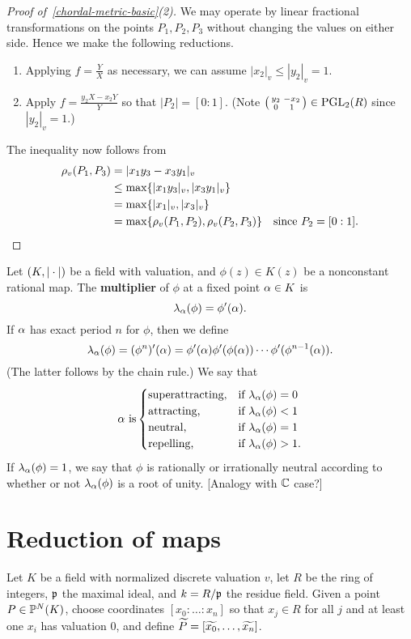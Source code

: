 \begin{proof}[Proof of~\ref{chordal-metric-basic}(2)]
We may operate by linear fractional transformations on the points $P_1,P_2,P_3$ without changing the values on either side. Hence we make the following reductions.
\begin{enumerate}
\item
Applying $f=\frac{Y}{X}$ as necessary, we can assume $|x_2|_v\le |y_2|_v=1$.
\item
Apply $f=\frac{y_2X-x_2Y}{Y}$ so that $|P_2|=[0:1]$. (Note $\left(\begin{smallmatrix} {y_2}&{-x_2}\\ {0}&{1} \end{smallmatrix}\right)\in \operatorname{PGL}_2(R)$ since $|y_2|_v=1$.)
\end{enumerate}
The inequality now follows from
\begin{align*}
\rho_v(P_1,P_3)&=
|x_1y_3-x_3y_1|_v\\
&\le \max \{|x_1y_3|_v,|x_3y_1|_v\}\\
&=\max\{|x_1|_v,|x_3|_v\}\\
&=\max\{\rho_v(P_1,P_2),\rho_v(P_2,P_3)\}&\text{since }P_2=[0:1].\qedhere
\end{align*}
\end{proof}
\begin{df}
Let $(K,|\cdot|)$ be a field with valuation, and $\phi(z)\in K(z)$ be a nonconstant rational map. The \textbf{multiplier} of $\phi$ at a fixed point $\alpha\in K$ is
\[
\lambda_{\alpha}(\phi)=\phi'(\alpha).
\]
If $\alpha$ has exact period $n$ for $\phi$, then we define
\[
\lambda_{\alpha}(\phi)=(\phi^n)'(\alpha)=\phi'(\alpha)\phi'(\phi(\alpha))\cdots \phi'(\phi^{n-1}(\alpha)).
\]
(The latter follows by the chain rule.)
We say that
\[
\alpha\text{ is}
\begin{cases}
\text{superattracting,}&\text{if }\lambda_{\alpha}(\phi)=0\\
\text{attracting,}&\text{if }\lambda_{\alpha}(\phi)<1\\
\text{neutral,}&\text{if }\lambda_{\alpha}(\phi)=1\\
\text{repelling,}&\text{if }\lambda_{\alpha}(\phi)>1.
\end{cases}
\]
If $\lambda_{\alpha}(\phi)=1$, we say that $\phi$ is rationally or irrationally neutral according to whether or not $\lambda_{\alpha}(\phi)$ is a root of unity.
[Analogy with $\mathbb{C}$ case?]
\end{df}
\section{Reduction of maps}
Let $K$ be a field with normalized discrete valuation $v$, let $R$ be the ring of integers, $\mathfrak{p}$ the maximal ideal, and $k=R/\mathfrak{p}$ the residue field. Given a point $P\in\mathbb{P}^N(K)$,  %
choose coordinates $[x_0:\ldots:x_n]$ so that $x_j\in R$ for all $j$ and at least one $x_i$ has valuation 0, and define $\widetilde{P}=[\widetilde{x_0},\ldots, \widetilde{x_n}]$.

